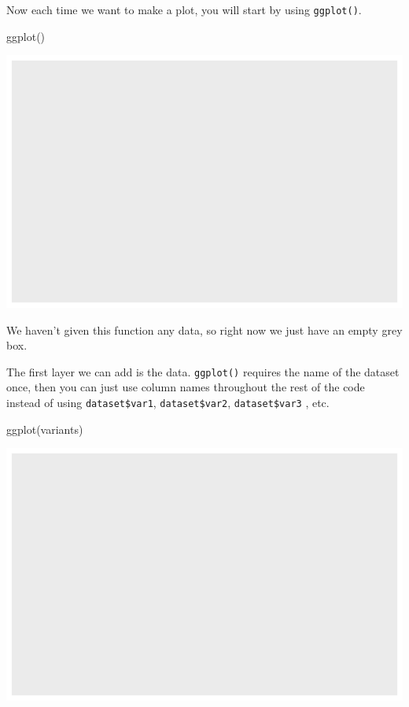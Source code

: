 \documentclass[
  letterpaper,
  DIV=11,
  numbers=noendperiod]{scrreprt}
\newenvironment{Shaded}{\begin{snugshade}}{\end{snugshade}}
\newcommand{\FunctionTok}[1]{\textcolor[rgb]{0.28,0.35,0.67}{#1}}
\newcommand{\NormalTok}[1]{\textcolor[rgb]{0.00,0.23,0.31}{#1}}
\begin{document}
Now each time we want to make a plot, you will start by using
\texttt{ggplot()}.

\begin{Shaded}
\begin{Highlighting}[]
\FunctionTok{ggplot}\NormalTok{()}
\end{Highlighting}
\end{Shaded}

\includegraphics{scripts/02_dataViz/class3_files/figure-pdf/unnamed-chunk-7-1.pdf}

We haven't given this function any data, so right now we just have an
empty grey box.

The first layer we can add is the data. \texttt{ggplot()} requires the
name of the dataset once, then you can just use column names throughout
the rest of the code instead of using \texttt{dataset\$var1},
\texttt{dataset\$var2}, \texttt{dataset\$var3} , etc.

\begin{Shaded}
\begin{Highlighting}[]
\FunctionTok{ggplot}\NormalTok{(variants)}
\end{Highlighting}
\end{Shaded}

\includegraphics{scripts/02_dataViz/class3_files/figure-pdf/unnamed-chunk-8-1.pdf}
\end{document}
